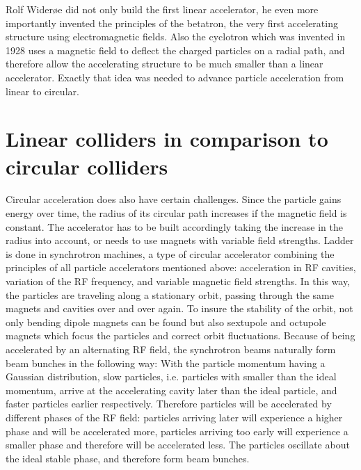 Rolf Wider\o e did not only build the first linear accelerator, he even more importantly invented the principles of the betatron, the very first accelerating structure using electromagnetic fields.
Also the cyclotron which was invented in 1928 uses a magnetic field to deflect the charged particles on a radial path, and therefore allow the accelerating structure to be much smaller than a linear accelerator.
Exactly that idea was needed to advance particle acceleration from linear to circular.

\section{Linear colliders in comparison to circular colliders}
\label{Linear-Circular}

Circular acceleration does also have certain challenges.
Since the particle gains energy over time, the radius of its circular path increases if the magnetic field is constant.
The accelerator has to be built accordingly taking the increase in the radius into account, or needs to use magnets with variable field strengths.
Ladder is done in synchrotron machines, a type of circular accelerator combining the principles of all particle accelerators mentioned above: acceleration in RF cavities, variation of the RF frequency, and variable magnetic field strengths.
In this way, the particles are traveling along a stationary orbit, passing through the same magnets and cavities over and over again.
To insure the stability of the orbit, not only bending dipole magnets can be found but also sextupole and octupole magnets which focus the particles and correct orbit fluctuations.
Because of being accelerated by an alternating RF field, the synchrotron beams naturally form beam bunches in the following way:
With the particle momentum having a Gaussian distribution, slow particles, i.e. particles with smaller than the ideal momentum, arrive at the accelerating cavity later than the ideal particle, and faster particles earlier respectively.
Therefore particles will be accelerated by different phases of the RF field: particles arriving later will experience a higher phase and will be accelerated more, particles arriving too early will experience a smaller phase and therefore will be accelerated less.
The particles oscillate about the ideal stable phase, and therefore form beam bunches.


